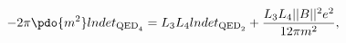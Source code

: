 \begin{equation}
\label{Eq_0601}
-2\pi \pdo{m^2} lndet_{\text{QED}_4}
  = L_3 L_4 lndet_{\text{QED}_2}
    + \frac{L_3 L_4 ||B||^2 e^2}{12\pi m^2},
\end{equation}

